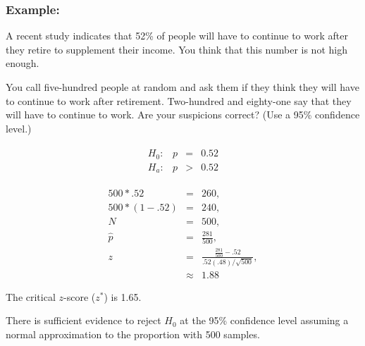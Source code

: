 \begin{frame}
  \frametitle{Example: }

  \vspace*{-2em}
  A recent study indicates that 52\% of people will have to continue
  to work after they retire to supplement their income. You think that
  this number is not high enough. 

  You call five-hundred people at random and ask them if they think
  they will have to continue to work after retirement. Two-hundred and
  eighty-one say that they will have to continue to work. Are your
  suspicions correct?  (Use a 95\% confidence level.)

  {
    \begin{eqnarray*}
      \begin{array}{lrcl}
        H_0: & p & = & 0.52 \\
        H_a: & p & > & 0.52
      \end{array}
    \end{eqnarray*}
  }

  {
    \begin{eqnarray*}
      500*.52     & = & 260, \\
      500*(1-.52) & = & 240, \\
      N & = & 500, \\
      \hat{p} & = & \frac{281}{500}, \\
      z & = & \frac{\frac{281}{500}-.52}{.52(.48)/\sqrt{500}}, \\
      & \approx & 1.88
    \end{eqnarray*}
  }
  

  {
    The critical $z$-score ($z^*$) is 1.65.
  }

  {

    {\color{red}
      There is sufficient evidence to reject $H_0$ at the 95\%
      confidence level assuming a normal approximation to the
      proportion with 500 samples.
    }

  }


  
\end{frame}


